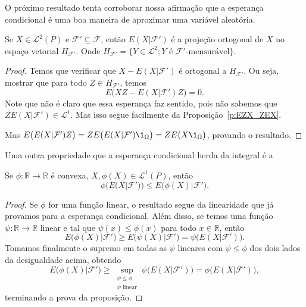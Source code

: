 O próximo resultado tenta corroborar nossa afirmação que a esperança condicional é uma boa maneira de aproximar uma variável aleatória.

\begin{lemma}
  Se $X \in \mathcal{L}^2(P)$ e $\mathcal{F}' \subseteq \mathcal{F}$, então $E(X|\mathcal{F}')$ é a projeção ortogonal de $X$ no espaço vetorial $H_{\mathcal{F}'}$.
  Onde $H_{\mathcal{F}'} = \{Y \in \mathcal{L}^2; Y \text{ é $\mathcal{F}'$-mensurável}\}$.
\end{lemma}

\begin{proof}
  Temos que verificar que $X - E(X|\mathcal{F}')$ é ortogonal a $H_{\mathcal{F}'}$.
  Ou seja, mostrar que para todo $Z \in H_{\mathcal{F}'}$, temos
  \begin{equation}
    E\big( XZ - E(X|\mathcal{F}') Z \big) = 0.
  \end{equation}
  Note que não é claro que essa esperança faz sentido, pois não sabemos que $ZE(X|\mathcal{F}') \in \mathcal{L}^1$.
  Mas isso segue facilmente da Proposição~\ref{p:EZX_ZEX}.

  Mas $E\big( E(X|\mathcal{F}') Z \big) = Z E\big( E(X | \mathcal{F}') \1_\Omega \big) = Z E\big( X \1_\Omega \big)$, provando o resultado.
\end{proof}

Uma outra propriedade que a esperança condicional herda da integral é a

\begin{proposition}
  Se $\phi:\mathbb{R} \to \mathbb{R}$ é convexa, $X, \phi(X) \in \mathcal{L}^1(P)$, então
  \begin{equation}
    \phi\big( E(X|\mathcal{F}') \big) \leq E\big( \phi(X) | \mathcal{F}' \big).
  \end{equation}
\end{proposition}

\begin{proof}
  Se $\phi$ for uma função linear, o resultado segue da linearidade que já provamos para a esperança condicional.
  Além disso, se temos uma função $\psi:\mathbb{R} \to \mathbb{R}$ linear e tal que $\psi(x) \leq \phi(x)$ para todo $x \in \mathbb{R}$, então
  \begin{equation}
    E\big( \phi(X) | \mathcal{F}' \big) \geq E\big( \psi(X) | \mathcal{F}' \big) = \psi \big( E(X|\mathcal{F}') \big).
  \end{equation}
  Tomamos finalmente o supremo em todas as $\psi$ lineares com $\psi \leq \phi$ dos dois lados da desigualdade acima, obtendo
  \begin{equation}
    E\big( \phi(X) | \mathcal{F}' \big) \geq \sup_{\substack{\psi \leq \phi\\\psi \text{ linear}}} \psi \big( E(X|\mathcal{F}') \big) = \phi \big( E(X|\mathcal{F}') \big),
  \end{equation}
  terminando a prova da proposição.
\end{proof}

